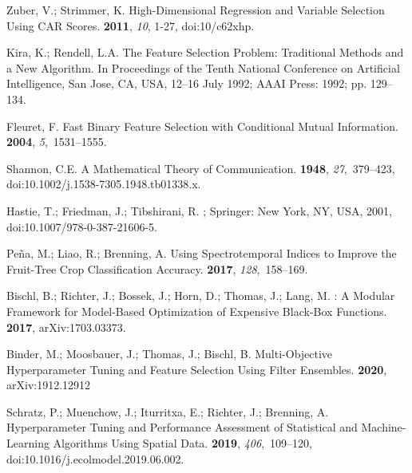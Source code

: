 \documentclass[remotesensing,article,accept,moreauthors,pdftex]{Definitions/mdpi}
\begin{document}
\begin{thebibliography}{999}
Zuber, V.; Strimmer, K.
\newblock High-{{Dimensional Regression}} and {{Variable Selection Using CAR
  Scores}}.
 {\bf
  2011}, {\em 10}, 1-27, doi:10/c62xhp.


Kira, K.; Rendell, L.A.
\newblock The Feature Selection Problem: Traditional Methods and a New
  Algorithm.
\newblock  In Proceedings of the Tenth National Conference on {{Artificial}}
  Intelligence, San Jose, CA, USA, 12--16 July 1992; {AAAI Press}:  1992; pp. 129--134.

Fleuret, F.
\newblock Fast {{Binary Feature Selection}} with {{Conditional Mutual
  Information}}.
 {\bf 2004}, {\em
  5},~1531--1555.

Shannon, C.E.
\newblock A Mathematical Theory of Communication.
 {\bf 1948}, {\em
  27},~379--423, doi:10.1002/j.1538-7305.1948.tb01338.x.

Hastie, T.; Friedman, J.; Tibshirani, R.
; {Springer}: New York, NY, USA,
  2001, doi:10.1007/978-0-387-21606-5.

Pe{\~n}a, M.; Liao, R.; Brenning, A.
\newblock Using Spectrotemporal Indices to Improve the Fruit-Tree Crop
  Classification Accuracy.
 {\bf 2017},
  {\em 128},~158--169.

Bischl, B.; Richter, J.; Bossek, J.; Horn, D.; Thomas, J.; Lang, M.
: A {{Modular Framework}} for {{Model}}-{{Based
  Optimization}} of {{Expensive Black}}-{{Box Functions}}.
 {\bf 2017}, arXiv:1703.03373.


Binder, M.; Moosbauer, J.; Thomas, J.; Bischl, B.
\newblock Multi-{{Objective Hyperparameter Tuning}} and {{Feature Selection}}
  Using {{Filter Ensembles}}.
 {\bf 2020},
  arXiv:1912.12912

Schratz, P.; Muenchow, J.; Iturritxa, E.; Richter, J.; Brenning, A.
\newblock Hyperparameter Tuning and Performance Assessment of Statistical and
  Machine-Learning Algorithms Using Spatial Data.
 {\bf 2019}, {\em 406},~109--120, doi:10.1016/j.ecolmodel.2019.06.002.


\end{thebibliography}
\end{document}
